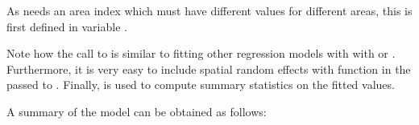 \documentclass[article]{jss}
\begin{document}
As  needs an area
index which must have different values for different areas, this is first
defined in variable .

\begin{Schunk}
\end{Schunk}

Note how the call to  is similar to fitting other regression
models with  with  or . Furthermore, 
it is very easy to include spatial random effects with function 
in the  passed to . Finally,  is used to compute summary statistics on the
fitted values.


A summary of the model can be obtained as
follows:
\end{document}
